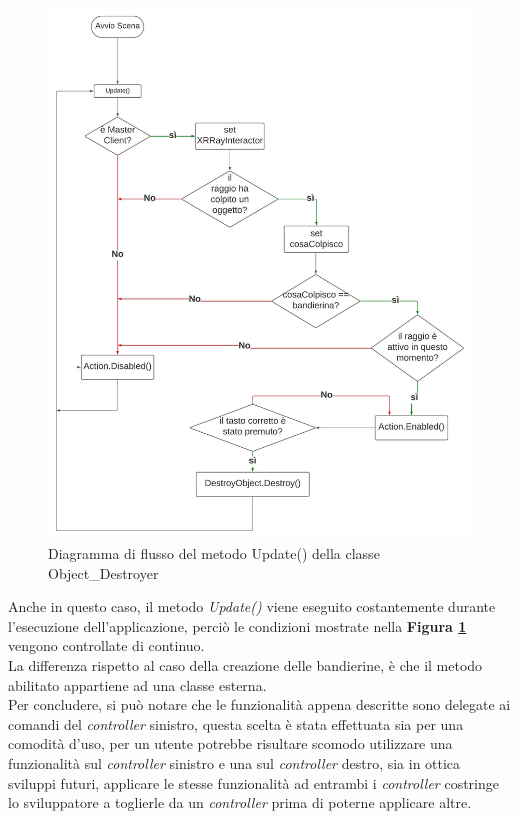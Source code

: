 \begin{figure}[H]
    \centering
    \includegraphics[scale = 0.45]{Immagini/ObjectDestroyer().jpg}
    \caption{Diagramma di flusso del metodo Update() della classe Object\_Destroyer}
    \label{fig:4.8}
\end{figure}
\hspace{-0.6cm}Anche in questo caso, il metodo \textit{Update()} viene eseguito costantemente durante l'esecuzione dell'applicazione, perciò le condizioni mostrate nella \textbf{Figura \ref{fig:4.8}} vengono controllate di continuo.
\\La differenza rispetto al caso della creazione delle bandierine, è che il metodo abilitato appartiene ad una classe esterna.
\\Per concludere, si può notare che le funzionalità appena descritte sono delegate ai comandi del \textit{controller} sinistro, questa scelta è stata effettuata sia per una comodità d'uso, per un utente potrebbe risultare scomodo utilizzare una funzionalità sul \textit{controller} sinistro e una sul \textit{controller} destro, sia in ottica sviluppi futuri, applicare le stesse funzionalità ad entrambi i \textit{controller} costringe lo sviluppatore a toglierle da un \textit{controller} prima di poterne applicare altre.
